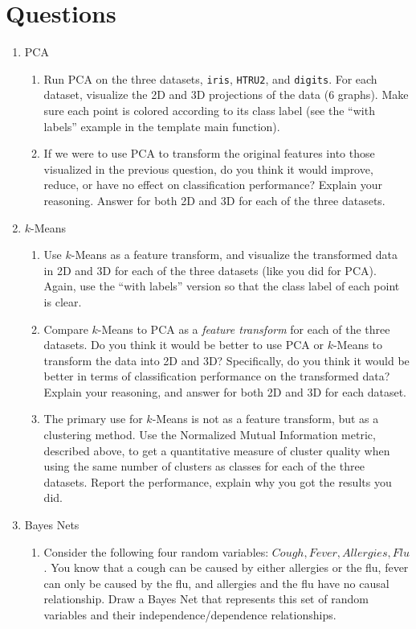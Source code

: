 \documentclass{article}
\begin{document}
\section*{Questions}
\begin{enumerate}
	\item PCA
	\begin{enumerate}
		\item Run PCA on the three datasets, \texttt{iris}, \texttt{HTRU2}, and \texttt{digits}. For each dataset, visualize the 2D and 3D projections of the data (6 graphs). Make sure each point is colored according to its class label (see the ``with labels'' example in the template main function).
		\item If we were to use PCA to transform the original features into those visualized in the previous question, do you think it would improve, reduce, or have no effect on classification performance? Explain your reasoning. Answer for both 2D and 3D for each of the three datasets.
	\end{enumerate}
	\item \(k\)-Means
	\begin{enumerate}
		\item Use \(k\)-Means as a feature transform, and visualize the transformed data in 2D and 3D for each of the three datasets (like you did for PCA). Again, use the ``with labels'' version so that the class label of each point is clear.
		\item Compare \(k\)-Means to PCA as a \emph{feature transform} for each of the three datasets. Do you think it would be better to use PCA or \(k\)-Means to transform the data into 2D and 3D? Specifically, do you think it would be better in terms of classification performance on the transformed data? Explain your reasoning, and answer for both 2D and 3D for each dataset.
		\item The primary use for \(k\)-Means is not as a feature transform, but as a clustering method. Use the Normalized Mutual Information metric, described above, to get a quantitative measure of cluster quality when using the same number of clusters as classes for each of the three datasets. Report the performance, explain why you got the results you did.
	\end{enumerate}
	\item Bayes Nets
	\begin{enumerate}
		\item Consider the following four random variables: \(Cough, Fever, Allergies, Flu\). You know that a cough can be caused by either allergies or the flu, fever can only be caused by the flu, and allergies and the flu have no causal relationship. Draw a Bayes Net that represents this set of random variables and their independence/dependence relationships.

\end{enumerate}
\end{enumerate}
\end{document}
